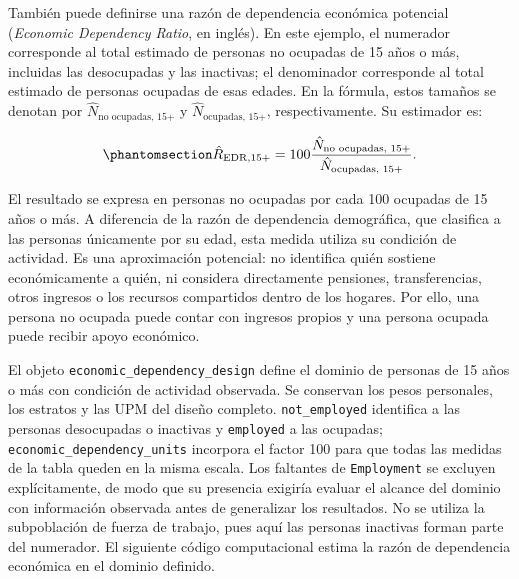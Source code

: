 \documentclass[
  spanish,
  11pt,
  letterpaper,
  oneside,
  open=any]{scrbook}
\begin{document}
También puede definirse una razón de dependencia económica potencial
(\emph{Economic Dependency Ratio}, en inglés). En este ejemplo, el
numerador corresponde al total estimado de personas no ocupadas de 15
años o más, incluidas las desocupadas y las inactivas; el denominador
corresponde al total estimado de personas ocupadas de esas edades. En la
fórmula, estos tamaños se denotan por
\(\hat N_{\text{no ocupadas, 15+}}\) y
\(\hat N_{\text{ocupadas, 15+}}\), respectivamente. Su estimador es:

\begin{equation}\protect\phantomsection\label{eq-dependencia-economica-potencial}{
\hat R_{\mathrm{EDR},15+}
=
100\frac{\hat N_{\text{no ocupadas, 15+}}}
{\hat N_{\text{ocupadas, 15+}}}.
}\end{equation}

El resultado se expresa en personas no ocupadas por cada 100 ocupadas de
15 años o más. A diferencia de la razón de dependencia demográfica, que
clasifica a las personas únicamente por su edad, esta medida utiliza su
condición de actividad. Es una aproximación potencial: no identifica
quién sostiene económicamente a quién, ni considera directamente
pensiones, transferencias, otros ingresos o los recursos compartidos
dentro de los hogares. Por ello, una persona no ocupada puede contar con
ingresos propios y una persona ocupada puede recibir apoyo económico.

El objeto \texttt{economic\_dependency\_design} define el dominio de
personas de 15 años o más con condición de actividad observada. Se
conservan los pesos personales, los estratos y las UPM del diseño
completo. \texttt{not\_employed} identifica a las personas desocupadas o
inactivas y \texttt{employed} a las ocupadas;
\texttt{economic\_dependency\_units} incorpora el factor 100 para que
todas las medidas de la tabla queden en la misma escala. Los faltantes
de \texttt{Employment} se excluyen explícitamente, de modo que su
presencia exigiría evaluar el alcance del dominio con información
observada antes de generalizar los resultados. No se utiliza la
subpoblación de fuerza de trabajo, pues aquí las personas inactivas
forman parte del numerador. El siguiente código computacional estima la
razón de dependencia económica en el dominio definido.
\end{document}
